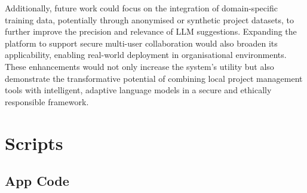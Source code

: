 \documentclass{report}
\begin{document}
Additionally, future work could focus on the integration of domain-specific training data, potentially through anonymised or synthetic project datasets, to further improve the precision and relevance of LLM suggestions. Expanding the platform to support secure multi-user collaboration would also broaden its applicability, enabling real-world deployment in organisational environments. These enhancements would not only increase the system's utility but also demonstrate the transformative potential of combining local project management tools with intelligent, adaptive language models in a secure and ethically responsible framework.



\printbibliography 


\appendix
\chapter{Scripts}
\section{App Code}
\end{document}
